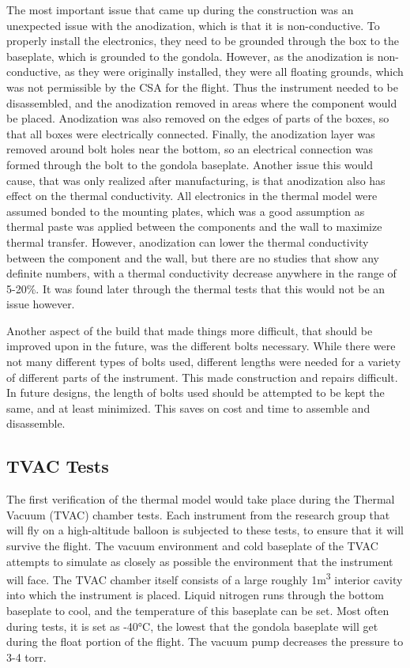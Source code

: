 The most important issue that came up during the construction was an unexpected issue with the anodization, which is that it is non-conductive. To properly install the electronics, they need to be grounded through the box to the baseplate, which is grounded to the gondola. However, as the anodization is non-conductive, as they were originally installed, they were all floating grounds, which was not permissible by the CSA for the flight. Thus the instrument needed to be disassembled, and the anodization removed in areas where the component would be placed. Anodization was also removed on the edges of parts of the boxes, so that all boxes were electrically connected. Finally, the anodization layer was removed around bolt holes near the bottom, so an electrical connection was formed through the bolt to the gondola baseplate. Another issue this would cause, that was only realized after manufacturing, is that anodization also has effect on the thermal conductivity. All electronics in the thermal model were assumed bonded to the mounting plates, which was a good assumption as thermal paste was applied between the components and the wall to maximize thermal transfer. However, anodization can lower the thermal conductivity between the component and the wall, but there are no studies that show any definite numbers, with a thermal conductivity decrease anywhere in the range of 5-20\%. It was found later through the thermal tests that this would not be an issue however.

Another aspect of the build that made things more difficult, that should be improved upon in the future, was the different bolts necessary. While there were not many different types of bolts used, different lengths were needed for a variety of different parts of the instrument. This made construction and repairs difficult. In future designs, the length of bolts used should be attempted to be kept the same, and at least minimized. This saves on cost and time to assemble and disassemble.

\subsection{TVAC Tests}\label{TVAC_tests}
The first verification of the thermal model would take place during the Thermal Vacuum (TVAC) chamber tests. Each instrument from the research group that will fly on a high-altitude balloon is subjected to these tests, to ensure that it will survive the flight. The vacuum environment and cold baseplate of the TVAC attempts to simulate as closely as possible the environment that the instrument will face. The TVAC chamber itself consists of a large roughly 1m\textsuperscript{3} interior cavity into which the instrument is placed. Liquid nitrogen runs through the bottom baseplate to cool, and the temperature of this baseplate can be set. Most often during tests, it is set as -40°C, the lowest that the gondola baseplate will get during the float portion of the flight. The vacuum pump decreases the pressure to 3-4 torr.

